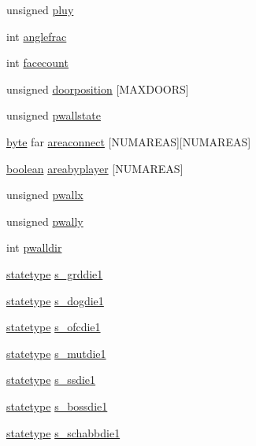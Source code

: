 \begin{DoxyCompactItemize}
\item 
unsigned \hyperlink{WL__DEF_8H_a2b130e086f58d4d881053d67b98c8251}{pluy}
\item 
int \hyperlink{WL__DEF_8H_a1f69f7886d762367ccbc2596edaf00e9}{anglefrac}
\item 
int \hyperlink{WL__DEF_8H_aba3b8c5c49be6b7ece93f58d0283fdfe}{facecount}
\item 
unsigned \hyperlink{WL__DEF_8H_a40e94301053d665ef509efdce52da5cb}{doorposition} \mbox{[}MAXDOORS\mbox{]}
\item 
unsigned \hyperlink{WL__DEF_8H_aeaaf2c9c46920d834ddd1b3f22b51378}{pwallstate}
\item 
\hyperlink{ID__HEAD_8H_a0c8186d9b9b7880309c27230bbb5e69d}{byte} far \hyperlink{WL__DEF_8H_a508c3e1ce5df30e83a5b0d8711d6422b}{areaconnect} \mbox{[}NUMAREAS\mbox{]}\mbox{[}NUMAREAS\mbox{]}
\item 
\hyperlink{ID__HEAD_8H_a7c6368b321bd9acd0149b030bb8275ed}{boolean} \hyperlink{WL__DEF_8H_a59682b519d59a900dd195516111d7cc4}{areabyplayer} \mbox{[}NUMAREAS\mbox{]}
\item 
unsigned \hyperlink{WL__DEF_8H_af83d84af47696a055efab255b82e0b41}{pwallx}
\item 
unsigned \hyperlink{WL__DEF_8H_aceefed33cfcf3369c2b94d0ea3f5f129}{pwally}
\item 
int \hyperlink{WL__DEF_8H_a0bb9addf1c68a7920598824991a4a290}{pwalldir}
\item 
\hyperlink{structstatestruct}{statetype} \hyperlink{WL__DEF_8H_a24864a0aad4623326b4d7ca0ead6407e}{s\_\-grddie1}
\item 
\hyperlink{structstatestruct}{statetype} \hyperlink{WL__DEF_8H_a194d846647c57b650ec0478566bac165}{s\_\-dogdie1}
\item 
\hyperlink{structstatestruct}{statetype} \hyperlink{WL__DEF_8H_a745d239bab5bd2f02d5fe4d833075321}{s\_\-ofcdie1}
\item 
\hyperlink{structstatestruct}{statetype} \hyperlink{WL__DEF_8H_a2af253b4fd1ed084c59d184f2bd6ac9a}{s\_\-mutdie1}
\item 
\hyperlink{structstatestruct}{statetype} \hyperlink{WL__DEF_8H_ab17dfc4394913bd79a55ab99142b43f4}{s\_\-ssdie1}
\item 
\hyperlink{structstatestruct}{statetype} \hyperlink{WL__DEF_8H_a154c6599f4cf6660a5c19ed11a022f38}{s\_\-bossdie1}
\item 
\hyperlink{structstatestruct}{statetype} \hyperlink{WL__DEF_8H_a893439687b453e85400bf0010c99a361}{s\_\-schabbdie1}
\item 

\end{DoxyCompactItemize}
